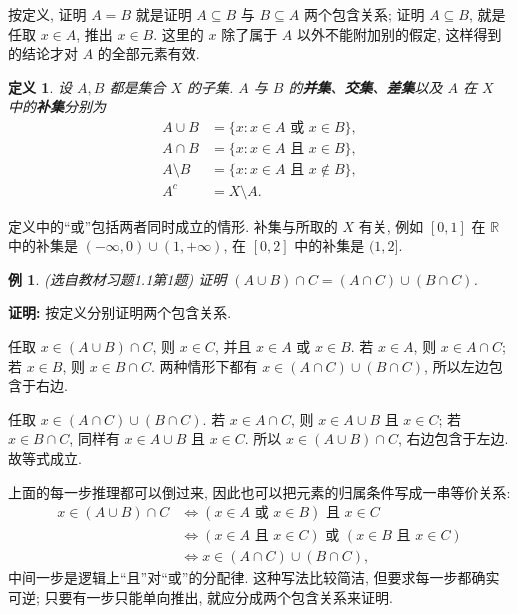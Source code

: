 \documentclass[UTF8,openany]{ctexbook}
\theoremstyle{chinesetextbook}
\newtheorem{definition}{定义}[section]
\newtheorem{example}{例}[section]
\newenvironment{cnproof}{\par\indent\textbf{证明:} \ignorespaces}{\par}
\begin{document}
按定义, 证明 $A=B$ 就是证明 $A\subseteq B$ 与 $B\subseteq A$ 两个包含关系; 证明 $A\subseteq B$, 就是任取 $x\in A$, 推出 $x\in B$. 这里的 $x$ 除了属于 $A$ 以外不能附加别的假定, 这样得到的结论才对 $A$ 的全部元素有效.
\begin{definition}
设 $A,B$ 都是集合 $X$ 的子集. $A$ 与 $B$ 的\textbf{并集}、\textbf{交集}、\textbf{差集}以及 $A$ 在 $X$ 中的\textbf{补集}分别为
\[
\begin{aligned}
A\cup B&=\{x:x\in A\text{ 或 }x\in B\},\\
A\cap B&=\{x:x\in A\text{ 且 }x\in B\},\\
A\setminus B&=\{x:x\in A\text{ 且 }x\notin B\},\\
A^c&=X\setminus A.
\end{aligned}
\]
\end{definition}
定义中的“或”包括两者同时成立的情形. 补集与所取的 $X$ 有关, 例如 $[0,1]$ 在 $\mathbb R$ 中的补集是 $(-\infty,0)\cup(1,+\infty)$, 在 $[0,2]$ 中的补集是 $(1,2]$.
\begin{example}
\textnormal{(选自教材习题1.1第1题)} 证明 $(A\cup B)\cap C=(A\cap C)\cup(B\cap C)$.
\end{example}
\begin{cnproof}
按定义分别证明两个包含关系.

任取 $x\in(A\cup B)\cap C$, 则 $x\in C$, 并且 $x\in A$ 或 $x\in B$. 若 $x\in A$, 则 $x\in A\cap C$; 若 $x\in B$, 则 $x\in B\cap C$. 两种情形下都有 $x\in(A\cap C)\cup(B\cap C)$, 所以左边包含于右边.

任取 $x\in(A\cap C)\cup(B\cap C)$. 若 $x\in A\cap C$, 则 $x\in A\cup B$ 且 $x\in C$; 若 $x\in B\cap C$, 同样有 $x\in A\cup B$ 且 $x\in C$. 所以 $x\in(A\cup B)\cap C$, 右边包含于左边. 故等式成立.
\end{cnproof}
上面的每一步推理都可以倒过来, 因此也可以把元素的归属条件写成一串等价关系:
\[
\begin{aligned}
x\in(A\cup B)\cap C
&\iff (x\in A\text{ 或 }x\in B)\text{ 且 }x\in C\\
&\iff (x\in A\text{ 且 }x\in C)\text{ 或 }(x\in B\text{ 且 }x\in C)\\
&\iff x\in(A\cap C)\cup(B\cap C),
\end{aligned}
\]
中间一步是逻辑上“且”对“或”的分配律. 这种写法比较简洁, 但要求每一步都确实可逆; 只要有一步只能单向推出, 就应分成两个包含关系来证明.
\end{document}
